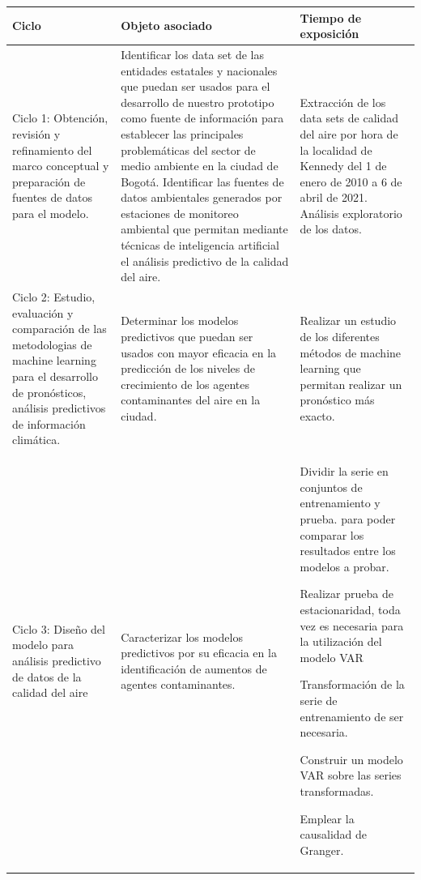 \begin{table}[h]
	\begin{center}
		\begin{tabular}{| p{4cm} | p{4cm} | p{4cm} |}
			\hline
			\rowcolor{lightgray}
			Ciclo 			& Objeto asociado 	& Tiempo de exposición	\\ \hline
			
			Ciclo 1: Obtención, revisión y refinamiento del marco conceptual y preparación de fuentes de datos para el modelo.			
			& Identificar los data set de las entidades estatales y nacionales que puedan ser usados para el desarrollo de nuestro prototipo como fuente de información para establecer las principales problemáticas del sector de medio ambiente en la ciudad de Bogotá.
			Identificar las fuentes de datos ambientales generados por estaciones de monitoreo ambiental que permitan mediante técnicas de inteligencia artificial el análisis predictivo de la calidad del aire.
	 		& Extracción de los data sets de calidad del aire por hora de la localidad de Kennedy del 1 de enero de 2010 a 6 de abril de 2021.
	 		Análisis exploratorio de los datos.\\ \hline
	 		
			Ciclo 2: Estudio, evaluación y comparación de las metodologias de machine learning para el desarrollo de pronósticos, análisis predictivos de información climática.							& Determinar los modelos predictivos que puedan ser usados con mayor eficacia en la predicción de los niveles de crecimiento de los agentes contaminantes del aire en la ciudad.	
			& Realizar un estudio de los diferentes métodos de machine learning que permitan realizar un pronóstico más exacto.  	\\ \hline
			
			Ciclo 3: Diseño del modelo para análisis predictivo de datos de la calidad del aire							
			& Caracterizar los modelos predictivos por su eficacia en la identificación de aumentos de agentes contaminantes.		
			& Dividir la serie en conjuntos de entrenamiento y prueba. para poder comparar los resultados entre los modelos a probar.
			
			Realizar prueba de estacionaridad, toda vez es necesaria para la utilización del modelo VAR
			
			Transformación de la serie de entrenamiento de ser necesaria.
			
			Construir un modelo VAR sobre las series transformadas.
			
			Emplear la causalidad de Granger.
			

\end{tabular}
\end{center}
\end{table}
